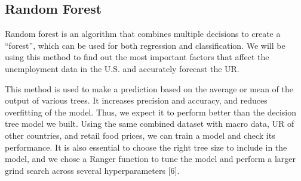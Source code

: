 \documentclass{article}
\begin{document}
	\subsection{Random Forest}
	Random forest is an algorithm that combines multiple decisions to create a “forest”, which can be used for both regression and classification. We will be using this method to find out the most important factors that affect the unemployment data in the U.S. and accurately forecast the UR.

	This method is used to make a prediction based on the average or mean of the output of various trees. It increases precision and accuracy, and reduces overfitting of the model. Thus, we expect it to perform better than the decision tree model we built. Using the same combined dataset with macro data, UR of other countries, and retail food prices, we can train a model and check its performance. It is also essential to choose the right tree size to include in the model, and we chose a Ranger function to tune the model and perform a larger grind search across several hyperparameters [6].
	
\end{document}
